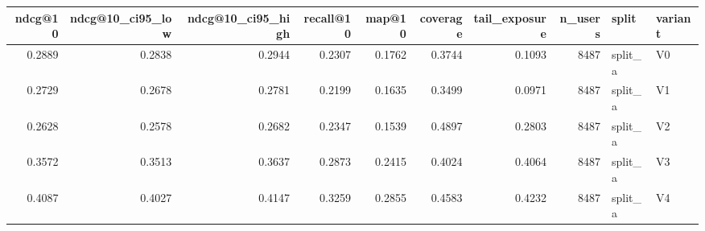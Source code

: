 \begin{tabular}{rrrrrrrrll}
\toprule
ndcg@10 & ndcg@10_ci95_low & ndcg@10_ci95_high & recall@10 & map@10 & coverage & tail_exposure & n_users & split & variant \\
\midrule
0.2889 & 0.2838 & 0.2944 & 0.2307 & 0.1762 & 0.3744 & 0.1093 & 8487 & split_a & V0 \\
0.2729 & 0.2678 & 0.2781 & 0.2199 & 0.1635 & 0.3499 & 0.0971 & 8487 & split_a & V1 \\
0.2628 & 0.2578 & 0.2682 & 0.2347 & 0.1539 & 0.4897 & 0.2803 & 8487 & split_a & V2 \\
0.3572 & 0.3513 & 0.3637 & 0.2873 & 0.2415 & 0.4024 & 0.4064 & 8487 & split_a & V3 \\
0.4087 & 0.4027 & 0.4147 & 0.3259 & 0.2855 & 0.4583 & 0.4232 & 8487 & split_a & V4 \\
\bottomrule
\end{tabular}
